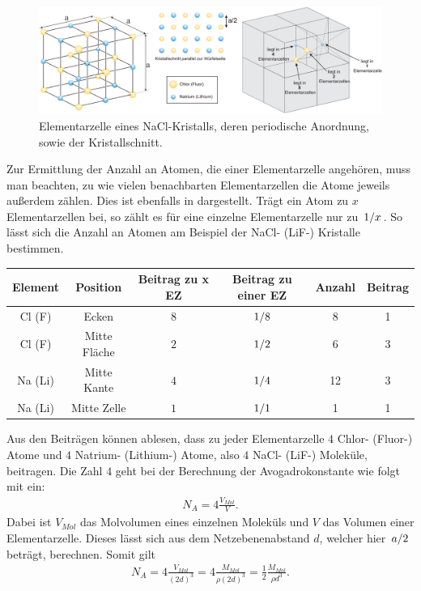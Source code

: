 \begin{figure}[H]
  \centering
  \includegraphics[width=\textwidth]{files/elementarzelle_nacl_reordered.png}
  \caption{Elementarzelle eines NaCl-Kristalls, deren periodische Anordnung, sowie der Kristallschnitt.}
  \label{fig:elementarzelle_nacl_reordered}
\end{figure}

Zur Ermittlung der Anzahl an Atomen, die einer Elementarzelle angehören, muss man beachten, zu wie vielen benachbarten Elementarzellen die Atome jeweils außerdem zählen. Dies ist ebenfalls in  dargestellt. Trägt ein Atom zu $x$ Elementarzellen bei, so zählt es für eine einzelne Elementarzelle nur zu $\flatfrac{1}{x}$. So lässt sich die Anzahl an Atomen am Beispiel der NaCl- (LiF-) Kristalle bestimmen.

\begin{table}[H]
  \centering
  \begin{tabular}{c|c|c|c||c|c}
    Element & Position & Beitrag zu x EZ & Beitrag zu einer EZ & Anzahl & Beitrag\\\hline
    Cl (F) & Ecken & $8$ & $\flatfrac{1}{8}$ & 8 & 1\\
    Cl (F) & Mitte Fläche & $2$ & $\flatfrac{1}{2}$ & 6 & 3\\
    Na (Li) & Mitte Kante & $4$ & $\flatfrac{1}{4}$ & 12 & 3\\
    Na (Li) & Mitte Zelle & $1$ & $\flatfrac{1}{1}$ & 1 & 1\\
  \end{tabular}
\end{table}

Aus den Beiträgen können ablesen, dass zu jeder Elementarzelle $4$ Chlor- (Fluor-) Atome und $4$ Natrium- (Lithium-) Atome, also $4$ NaCl- (LiF-) Moleküle, beitragen. Die Zahl $4$ geht bei der Berechnung der Avogadrokonstante wie folgt mit ein:
\begin{align}
  N_{A} = 4 \frac{V_{Mol}}{V}.
\end{align}
Dabei ist $V_{Mol}$ das Molvolumen eines einzelnen Moleküls und $V$ das Volumen einer Elementarzelle. Dieses lässt sich aus dem Netzebenenabstand $d$, welcher hier $\flatfrac{a}{2}$ beträgt, berechnen. Somit gilt
\begin{align}
  N_A = 4 \frac{V_{Mol}}{(2d)^3} = 4 \frac{M_{Mol}}{\rho (2d)^3} = \frac{1}{2}\frac{M_{Mol}}{\rho d^3}.\label{eq:avogadro}
\end{align}

